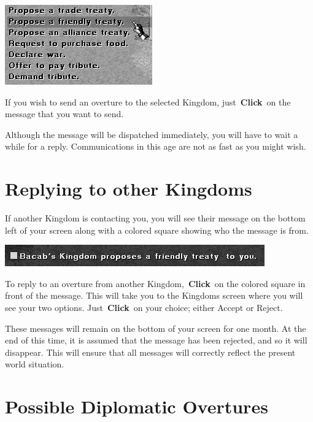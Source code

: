 \begin{center}
	\includegraphics[width=0.7\linewidth]{Idimplomacy_propose}
\end{center}

If you wish to send an overture to the selected Kingdom, just \textbf{Click} on the message that you want to send.

Although the message will be dispatched immediately, you will have to wait a while for a reply. Communications in this age are not as fast as you might wish.

\section{Replying to other Kingdoms}

If another Kingdom is contacting you, you will see their message on the bottom left of your screen along with a colored square showing who the message is from.

\begin{center}
	\includegraphics[width=0.7\linewidth]{Imessage}
\end{center}

To reply to an overture from another Kingdom, \textbf{Click} on the colored square in front of the message. This will take you to the Kingdoms screen where you will see your two options. Just \textbf{Click} on your choice; either Accept or Reject.

These messages will remain on the bottom of your screen for one month. At the end of this time, it is assumed that the message has been rejected, and so it will disappear. This will ensure that all messages will correctly reflect the present world situation.

\section{Possible Diplomatic Overtures}

